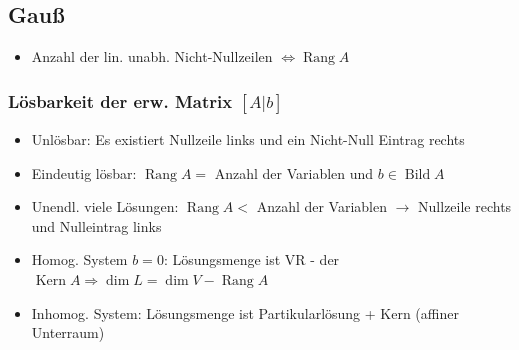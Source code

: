 \documentclass[german, fourcolumn, 8pt]{latex4ei/latex4ei_sheet}
\newcommand{\equival}[0]{\ensuremath{\Longleftrightarrow}}
\DeclareMathOperator{\Rang}{Rang}
\DeclareMathOperator{\Kern}{Kern}
\DeclareMathOperator{\Bild}{Bild}
\begin{document}
\begin{sectionbox}
    \subsection{Gauß}
    \begin{itemize}
        \item Anzahl der lin. unabh. Nicht-Nullzeilen $\equival \Rang A$
    \end{itemize}

    \subsubsection{Lösbarkeit der erw. Matrix $[A|b]$}
    \begin{itemize}
        \item Unlösbar: Es existiert Nullzeile links und ein Nicht-Null Eintrag rechts
        \item Eindeutig lösbar: $\Rang A =$ Anzahl der Variablen und $b \in \Bild A$
        \item Unendl. viele Lösungen: $\Rang A <$ Anzahl der Variablen $\rightarrow$ Nullzeile rechts und Nulleintrag links
        \item Homog. System $b=0$: Lösungsmenge ist VR - der $\Kern A \Rightarrow \dim L=\dim V - \Rang A$
        \item Inhomog. System: Lösungsmenge ist Partikularlösung + Kern (affiner Unterraum)
    \end{itemize}
\end{sectionbox}

\label{LastPage}
\end{document}
